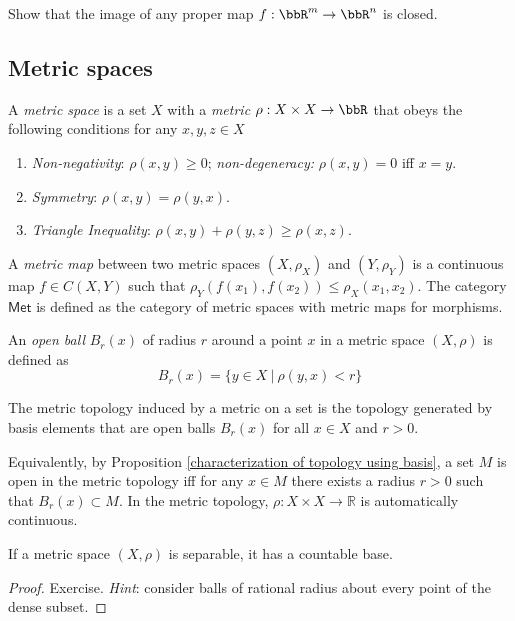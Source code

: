\begin{xca}
   Show that the image of any proper map $f:\bbR^m\to\bbR^n$ is closed.
\end{xca}

\subsection{Metric spaces}

\begin{defn}
A \emph{metric space} is a set $X$ with a \emph{metric} $\rho:X\times X\rightarrow \bbR $ that obeys the following conditions for any $x,y,z\in X$
\begin{enumerate}
    \item \emph{Non-negativity}: $\rho(x,y)\ge 0$; \emph{non-degeneracy:} $\rho(x,y)=0$ iff $x=y$.
    \item \emph{Symmetry}: $\rho(x,y) = \rho(y,x)$.
    \item \emph{Triangle Inequality}: $\rho(x,y) + \rho(y,z) \ge \rho(x,z)$.
\end{enumerate}
\end{defn}

\begin{defn}
A \emph{metric map} between two metric spaces $(X,\rho_X)$ and $(Y,\rho_Y)$ is a continuous map $f\in C(X,Y)$ such that $\rho_Y (f(x_1),f(x_2))\leq \rho_X (x_1,x_2)$. The category $\mathsf{Met}$ is defined as the category of metric spaces with metric maps for morphisms.
\end{defn}

\begin{defn}
An \emph{open ball} $B_r(x)$ of radius $r$ around a point $x$ in a metric space $(X,\rho)$ is defined as
\begin{equation}
    B_r(x) = \{ y\in X ~|~ \rho(y,x)< r \}
\end{equation}
\end{defn}

\begin{defn}
The metric topology induced by a metric on a set is the topology generated by basis elements that are open balls $B_r(x)$ for all $x\in X$ and $r>0$. 
\end{defn}
\begin{rem}
Equivalently, by Proposition \ref{characterization of topology using basis}, a set $M$ is open in the metric topology iff for any $x\in M$ there exists a radius $r>0$ such that $B_r(x)\subset M$. In the metric topology, $\rho:X\times X\to \mathbb R$ is automatically continuous.
\end{rem}
\begin{prop}
If a metric space $(X,\rho)$ is separable, it has a countable base.
\end{prop}
\begin{proof}
Exercise. \emph{Hint}: consider balls of rational radius about every point of the dense subset.
\end{proof}

